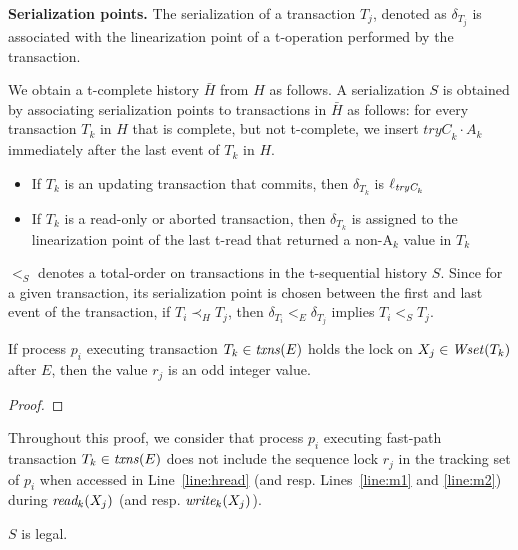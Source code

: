 \vspace{1mm}\noindent\textbf{Serialization points.}
The serialization of a transaction $T_j$, denoted as $\delta_{T_j}$ is
associated with the linearization point of a t-operation 
performed by the transaction.

We obtain a t-complete history ${\bar H}$ from $H$ as follows. 
A serialization $S$ is obtained by associating serialization points to transactions in ${\bar H}$ as follows:
for every transaction $T_k$ in $H$ that is complete, but not t-complete, 
we insert $\textit{tryC}_k\cdot A_k$ immediately 
after the last event of $T_k$ in $H$. 
%
\begin{itemize}
\item If $T_k$ is an updating transaction that commits, then $\delta_{T_k}$ is $\ell_{\textit{tryC}_k}$
\item If $T_k$ is a read-only or aborted transaction,
then $\delta_{T_k}$ is assigned to the linearization point of the last t-read that returned a non-A$_k$ value in $T_k$
\end{itemize}
%
$<_S$ denotes a total-order on transactions in the t-sequential history $S$.
Since for a given transaction, its
serialization point is chosen between the first and last event of the transaction,
if $T_i \prec_{H} T_j$, then $\delta_{T_i} <_{E} \delta_{T_j}$ implies $T_i <_S T_j$.
%
\begin{claim}
\label{cl:alg1claim}
%
If process $p_i$ executing transaction $T_k\in \ms{txns}(E)$ holds the lock on $X_j\in \ms{Wset}(T_k)$ after $E$, then the value $r_j$ is an odd integer value.
\end{claim}
%
\begin{proof}
%
\end{proof}
%
Throughout this proof, we consider that process $p_i$ executing fast-path transaction $T_k \in \ms{txns}(E)$
does not include the sequence lock $r_j$ in the tracking set of $p_i$ when accessed in Line~\ref{line:hread}
(and resp. Lines~\ref{line:m1} and \ref{line:m2}) during
$\textit{read}_k(X_j)$ (and resp. $\textit{write}_k(X_j)$).
%
\begin{claim}
\label{cl:readfrom}
$S$ is legal.
\end{claim}
%

